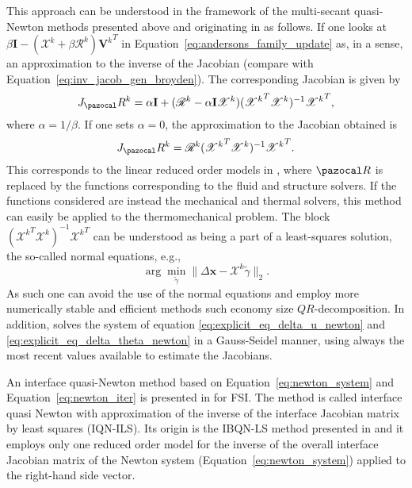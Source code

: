 This approach can be understood in the framework of the multi-secant quasi-Newton methods presented above and originating in \cite{fang_two_2009} as follows.
If one looks at \(\beta\mathbf I - (\mathscr X^k + \beta\mathscr R^k){\mathbf V^k}^T\) in Equation~\eqref{eq:andersons_family_update} as, in a sense, an approximation to the inverse of the Jacobian (compare with Equation~\eqref{eq:inv_jacob_gen_broyden}). 
The corresponding Jacobian is given by
\begin{equation}
  J_\pazocal R^k = \alpha\mathbf I + (\mathscr R^k - \alpha\mathbf I\mathscr X^k )({\mathscr X^k}^T\mathscr X^k)^{-1}{\mathscr X^k}^T,
\end{equation}
where \(\alpha=1/\beta\).
If one sets \(\alpha=0\), the approximation to the Jacobian obtained is
\begin{equation}
  J_\pazocal R^k = \mathscr R^k({\mathscr X^k}^T\mathscr X^k)^{-1}{\mathscr X^k}^T.
\end{equation}
This corresponds to the linear reduced order models in \cite{vierendeels_implicit_2007}, where \(\pazocal R\) is replaced by the functions corresponding to the fluid and structure solvers.
If the functions considered are instead the mechanical and thermal solvers, this method can easily be applied to the thermomechanical problem.
The block \(({\mathscr X^k}^T\mathscr X^k)^{-1}{\mathscr X^k}^T\) can be understood as being a part of a least-squares solution, the so-called normal equations, e.g.,
\begin{equation}
  \arg\min_{\tilde{\gamma}} \|\Delta \mathbf x - \mathscr{X}^k\tilde{\gamma}\|_2.
\end{equation}
As such one can avoid the use of the normal equations and employ more numerically stable and efficient methods such economy size \(QR\)-decomposition.
In addition, \cite{vierendeels_implicit_2007} solves the system of equation \eqref{eq:explicit_eq_delta_u_newton} and \eqref{eq:explicit_eq_delta_theta_newton} in a Gauss-Seidel manner, using always the most recent values available to estimate the Jacobians.

An interface quasi-Newton method based on Equation~\eqref{eq:newton_system} and Equation~\eqref{eq:newton_iter} is presented in \cite{degroote_development_2010} for FSI.
The method is called interface quasi Newton with approximation of the inverse of the interface Jacobian matrix by least squares (IQN-ILS).
Its origin is the IBQN-LS method presented in \cite{vierendeels_implicit_2007} and it employs only one reduced order model for the inverse of the overall interface Jacobian matrix of the Newton system (Equation~\eqref{eq:newton_system}) applied to the right-hand side vector.

